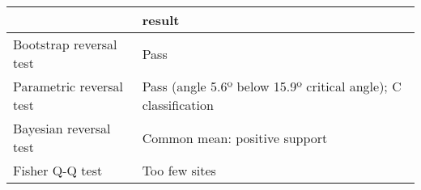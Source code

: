 \begin{tabular}{ll}
\toprule
{} &                                                          result \\
\midrule
Bootstrap reversal test  &                                                            Pass \\
Parametric reversal test &  Pass (angle 5.6º below 15.9º critical angle); C classification \\
Bayesian reversal test   &                                   Common mean: positive support \\
Fisher Q-Q test          &                                                   Too few sites \\
\bottomrule
\end{tabular}
